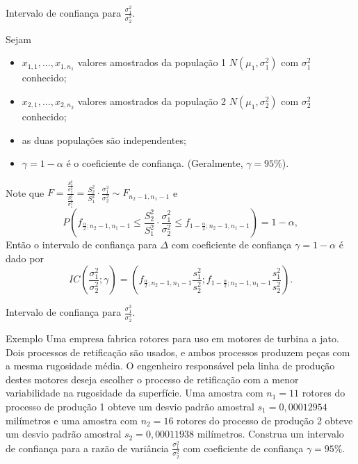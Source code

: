 \documentclass[9pt]{beamer}
\begin{document}
\begin{frame}{Intervalo de confiança para $\frac{\sigma_1^2}{\sigma_2^2}$.}

\small

Sejam
\begin{itemize}
	\item $x_{1,1}, \dots, x_{1,n_1}$ valores amostrados da população 1 $N(\mu_1, \sigma_1^2)$ com $\sigma_1^2$ conhecido;
	\item $x_{2,1}, \dots, x_{2,n_2}$ valores amostrados da população 2 $N(\mu_1, \sigma_2^2)$ com $\sigma_2^2$ conhecido;
	\item as duas populações são independentes;
	\item $\gamma=1-\alpha$ é o coeficiente de confiança. (Geralmente, $\gamma=95\%$).
\end{itemize}

Note que $F = \frac{\frac{S_2^2}{\sigma_2^2}}{\frac{S_1^2}{\sigma_1^2}} = \frac{S_2^2}{S_1^2} \cdot  \frac{\sigma_1^2}{\sigma_2^2} \sim F_{n_2-1, n_1-1}$ e 
$$P\left( f_{\frac{\alpha}{2}; n_2-1, n_1-1} \leq \frac{S_2^2}{S_1^2} \cdot  \frac{\sigma_1^2}{\sigma_2^2} \leq f_{1-\frac{\alpha}{2}; n_2-1, n_1-1} \right) = 1 - \alpha,$$
Então o intervalo de confiança para $\Delta$ com coeficiente de confiança $\gamma=1-\alpha$ é dado por
$$IC\left(\frac{\sigma_1^2}{\sigma_2^2}; \gamma\right) = \left( f_{\frac{\alpha}{2}; n_2-1, n_1-1} \frac{s_1^2}{s_2^2}; f_{1-\frac{\alpha}{2}; n_2-1, n_1-1} \frac{s_1^2}{s_2^2} \right).$$

\normalsize
\end{frame}

\begin{frame}{Intervalo de confiança para $\frac{\sigma_1^2}{\sigma_2^2}$.}
\begin{block}{Exemplo}
	Uma empresa fabrica rotores para uso em motores de turbina a jato. Dois processos de retificação são usados, e ambos processos produzem peças com a mesma rugosidade média.  O engenheiro responsável pela linha de produção destes motores deseja escolher o processo de retificação com a menor variabilidade na rugosidade da superfície. Uma amostra com $n_1 = 11$ rotores do processo de produção 1 obteve um desvio padrão amostral $s_1=0,00012954$ milímetros e uma amostra com $n_2=16$ rotores do processo de produção 2 obteve um desvio padrão amostral $s_2=0,00011938$ milímetros. Construa um intervalo de confiança para a razão de variância $\frac{\sigma_1^2}{\sigma_2^2}$ com coeficiente de confiança $\gamma = 95\%$.
\end{block}
\end{frame}
\end{document}

